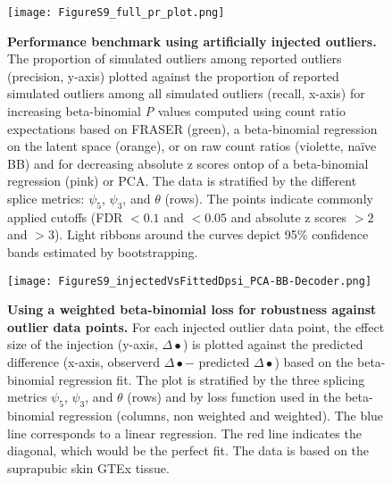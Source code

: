 \documentclass[a4paper,12pt]{article}
\begin{document}
\begin{figure}[h]
	\centering
	\texttt{[image: FigureS9\_full\_pr\_plot.png]}
	\caption{
	    \textbf{Performance benchmark using artificially injected outliers.} 
The proportion of simulated outliers among reported outliers (precision, y-axis)
plotted against the proportion of reported simulated outliers among all 
simulated outliers (recall, x-axis) for increasing beta-binomial \textit{P} values 
computed using count ratio expectations based on FRASER (green), 
a beta-binomial regression on the latent space (orange), or on raw count 
ratios (violette, na\"ive BB) and for decreasing absolute z scores ontop of 
a beta-binomial regression (pink) or PCA. The data is stratified by the different splice metrics: $\psi_5$, $\psi_3$, and $\theta$ (rows). The points indicate commonly 
applied cutoffs (FDR $< 0.1$ and $< 0.05$ and absolute z scores $>2$ and $>3$). 
Light ribbons around the curves depict 95\% confidence bands estimated by bootstrapping.
}
\end{figure}
\pagebreak


\begin{figure}[h]
\centering
	\texttt{[image: FigureS9\_injectedVsFittedDpsi\_PCA-BB-Decoder.png]}
	\caption{
	    \textbf{Using a weighted beta-binomial loss for robustness against outlier data points.}
For each injected outlier data point, the effect size of the injection 
(y-axis, $\Delta\bullet$) is plotted against the predicted difference 
(x-axis, observerd $\Delta\bullet -$ predicted $\Delta\bullet$) based on the beta-binomial 
regression fit. The plot is stratified by the three splicing metrics $\psi_5$,
$\psi_3$, and $\theta$ (rows) and by loss function used in the beta-binomial 
regression (columns, non weighted and weighted). The blue line corresponds to a 
linear regression. The red line indicates the diagonal, which would be the 
perfect fit. The data is based on the suprapubic skin GTEx tissue.
}
\end{figure}
\pagebreak
\end{document}
